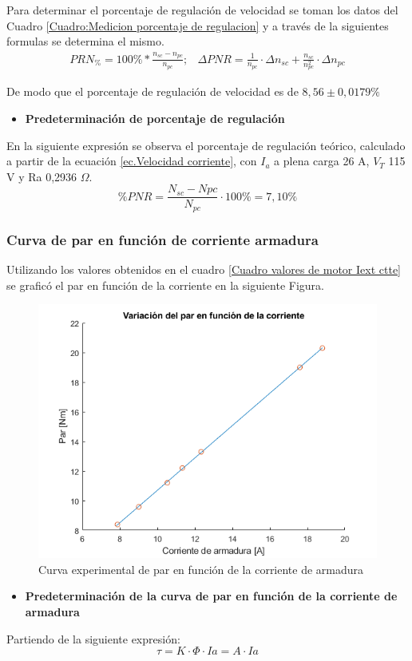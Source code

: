 \documentclass[11pt,letterpaper]{article}     %
\begin{document}
 Para determinar el porcentaje de regulación de velocidad se toman los datos del Cuadro \ref{Cuadro:Medicion porcentaje de regulacion} y a través de la siguientes formulas se determina el mismo.
 \begin{eqnarray}
  PRN_{\%} =100\%*\frac{n_{sc}-n_{pc}}{n_{pc}}; 
  & \Delta PNR = \frac{1 }{n_{pc}}\cdot \Delta n_{sc}+\frac{n_{sc} }{n_{pc}^2}\cdot \Delta n_{pc}
 \end{eqnarray}
 
De modo que el porcentaje de regulación de velocidad es de $8,56 \pm 0,0179 \%$
\begin{itemize}
	\item \textbf{Predeterminación de porcentaje de regulación}
\end{itemize}
En la siguiente expresión se observa el porcentaje de regulación teórico, calculado a partir de la ecuación \ref{ec.Velocidad corriente}, con $I_{a}$ a plena carga 26 A, $V_{T}$ 115 V y Ra 0,2936 $\Omega$.
\begin{equation}
\% PNR = \frac{N_{sc} - N {pc}}{N_{pc}} \cdot 100 \% = 7,10 \%
\end{equation}
\subsubsection{Curva de par en función de corriente armadura}
Utilizando los valores obtenidos en el cuadro \ref{Cuadro valores de motor Iext ctte} se graficó el par en función de la corriente en la siguiente Figura.
	\begin{figure}[H]
	\centering
	\includegraphics[scale=0.8]{./recursos-Lab6/curvaParCorrienteDeArmadura.png}
	\caption{Curva experimental de par en función de la corriente de armadura}
	\label{fig:CurvaDeParCorriente}
\end{figure}
\begin{itemize}
	\item \textbf{Predeterminación de la curva de par en función de la corriente de armadura}
\end{itemize}
Partiendo  de la siguiente expresión:
	\begin{equation}
		\tau = K \cdot \Phi \cdot Ia = A \cdot Ia
		\label{ecuacion par}
	\end{equation}
	
\end{document}
